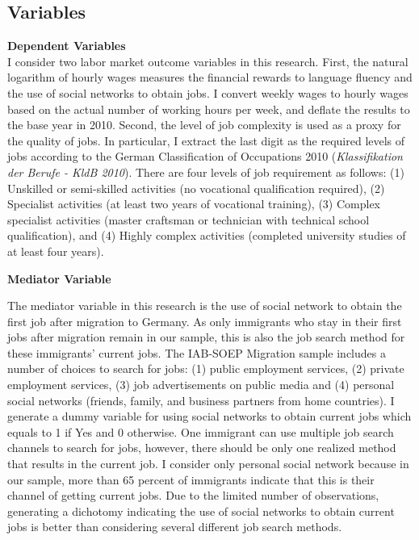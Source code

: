 \documentclass[12pt,a4paper]{article}
\begin{document}
\subsection{Variables}
\textbf{Dependent Variables} \\
I consider two labor market outcome variables in this research. First, the natural logarithm of hourly wages measures the financial rewards to language fluency and the use of social networks to obtain jobs. I convert weekly wages to hourly wages based on the actual number of working hours per week, and deflate the results to the base year in 2010. Second, the level of job complexity is used as a proxy for the quality of jobs. In particular, I extract the last digit as the required levels of jobs according to the German Classification of Occupations 2010 (\textit{Klassifikation der Berufe - KldB 2010}). There are four levels of job requirement as follows: (1) Unskilled or semi-skilled activities (no vocational qualification required), (2) Specialist activities (at least two years of vocational training), (3) Complex specialist activities (master craftsman or technician with technical school qualification), and (4) Highly complex activities (completed university studies of at least four years). 

\begin{flushleft}
\textbf{Mediator Variable} 
\end{flushleft}

The mediator variable in this research is the use of social network to obtain the first job after migration to Germany. As only immigrants who stay in their first jobs after migration remain in our sample, this is also the job search method for these immigrants' current jobs. The IAB-SOEP Migration sample includes a number of choices to search for jobs: (1) public employment services, (2) private employment services, (3) job advertisements on public media and (4) personal social networks (friends, family, and business partners from home countries). I generate a dummy variable for using social networks to obtain current jobs which equals to 1 if Yes and 0 otherwise. One immigrant can use multiple job search channels to search for jobs, however, there should be only one realized method that results in the current job. I consider only personal social network because in our sample, more than 65 percent of immigrants indicate that this is their channel of getting current jobs. Due to the limited number of observations, generating a dichotomy indicating the use of social networks to obtain current jobs is better than considering several different job search methods. 
\end{document}
